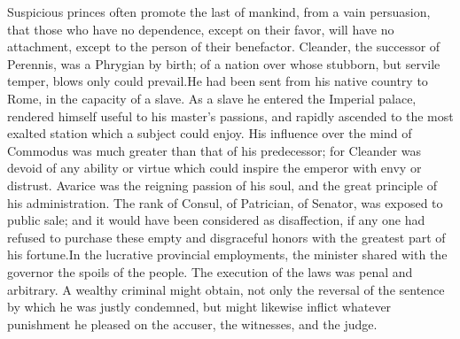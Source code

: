 

Suspicious princes often promote the last of mankind, from a vain
persuasion, that those who have no dependence, except on their
favor, will have no attachment, except to the person of their
benefactor. Cleander, the successor of Perennis, was a Phrygian
by birth; of a nation over whose stubborn, but servile temper,
blows only could prevail.\footnotemark[20] He had been sent from his native
country to Rome, in the capacity of a slave. As a slave he
entered the Imperial palace, rendered himself useful to his
master’s passions, and rapidly ascended to the most exalted
station which a subject could enjoy. His influence over the mind
of Commodus was much greater than that of his predecessor; for
Cleander was devoid of any ability or virtue which could inspire
the emperor with envy or distrust. Avarice was the reigning
passion of his soul, and the great principle of his
administration. The rank of Consul, of Patrician, of Senator, was
exposed to public sale; and it would have been considered as
disaffection, if any one had refused to purchase these empty and
disgraceful honors with the greatest part of his fortune.\footnotemark[21] In
the lucrative provincial employments, the minister shared with
the governor the spoils of the people. The execution of the laws
was penal and arbitrary. A wealthy criminal might obtain, not
only the reversal of the sentence by which he was justly
condemned, but might likewise inflict whatever punishment he
pleased on the accuser, the witnesses, and the judge.



